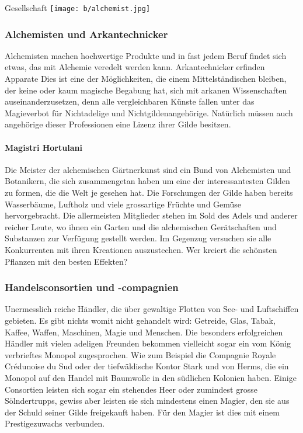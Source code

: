 \documentclass[10pt,twoside,twocolumn,openany]{book}
\newenvironment{mcolsec*}[1]{\section{#1}\begin{multicols}{2}}{
\end{multicols}}
\begin{document}
\begin{mcolsec*}{Gesellschaft}
		\texttt{[image: b/alchemist.jpg]}
	
	\subsubsection{Alchemisten und Arkantechnicker}
	Alchemisten machen hochwertige Produkte und in fast jedem Beruf findet sich etwas, das mit Alchemie veredelt werden kann. Arkantechnicker erfinden Apparate  Dies ist eine der Möglichkeiten, die einem Mittelständischen bleiben, der keine oder kaum magische Begabung hat, sich mit arkanen Wissenschaften auseinanderzusetzen, denn alle vergleichbaren Künste fallen unter das Magieverbot für Nichtadelige und Nichtgildenangehörige. Natürlich müssen auch angehörige dieser Professionen  eine Lizenz ihrer Gilde besitzen.
	\paragraph{Magistri Hortulani} Die Meister der alchemischen Gärtnerkunst sind ein Bund von Alchemisten und Botanikern, die sich zusammengetan haben um eine der interessantesten Gilden zu formen, die die Welt je gesehen hat. Die Forschungen der Gilde haben bereits Wasserbäume, Luftholz und viele grossartige Früchte und Gemüse hervorgebracht. Die allermeisten Mitglieder stehen im Sold des Adels und anderer reicher Leute, wo ihnen ein Garten und die alchemischen Gerätschaften und Substanzen zur Verfügung gestellt werden. Im Gegenzug versuchen sie alle Konkurrenten mit ihren Kreationen auszustechen. Wer kreiert die schönsten Pflanzen mit den besten Effekten?
	
	\subsubsection{Handelsconsortien und -compagnien}
	Unermesslich reiche Händler, die über gewaltige Flotten von See- und Luftschiffen gebieten. Es gibt nichts womit nicht gehandelt wird: Getreide, Glas, Tabak, Kaffee, Waffen, Maschinen, Magie und Menschen.
	Die besonders erfolgreichen Händler mit vielen adeligen Freunden bekommen vielleicht sogar ein vom König verbrieftes Monopol zugesprochen. Wie zum Beispiel die Compagnie Royale Crédunoise du Sud oder der tiefwäldische Kontor Stark und von Herms, die ein  Monopol auf den Handel mit Baumwolle in den südlichen Kolonien haben.
	Einige Consortien leisten sich sogar ein stehendes Heer oder zumindest grosse Sölndertrupps, gewiss aber leisten sie sich mindestens einen Magier, den sie aus der Schuld seiner Gilde freigekauft haben. Für den Magier ist dies mit einem Prestigezuwachs verbunden.
	


\end{mcolsec*}
\end{document}
